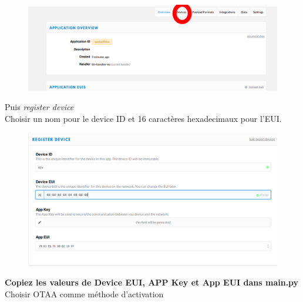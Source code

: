 \documentclass{article}
\begin{document}
        \begin{figure}[H]
\begin{center}
\advance\leftskip-3cm
\advance\rightskip-3cm
\includegraphics[keepaspectratio=true,scale=0.4]{add_device.png}
\label{visina8}
\end{center}\end{figure}

Puis \textit{register device} \\
Choisir un nom pour le device ID et 16 caractères hexadecimaux pour l'EUI.



 \begin{figure}[H]
\begin{center}
\advance\leftskip-3cm
\advance\rightskip-3cm
\includegraphics[keepaspectratio=true,scale=0.4]{device_eg.png}

\label{visina8}
\end{center}\end{figure}
 \textbf{Copiez les valeurs de Device EUI, APP Key et App EUI dans main.py}\\

 
 
 Choisir OTAA comme méthode d'activation
 
\end{document}
